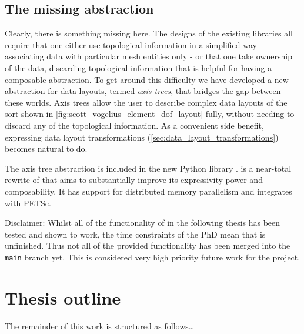 \documentclass[thesis]{subfiles}
\begin{document}

\subsection{The missing abstraction}

Clearly, there is something missing here.
The designs of the existing libraries all require that one either use topological information in a simplified way - associating data with particular mesh entities only - or that one take ownership of the data, discarding topological information that is helpful for having a composable abstraction.
To get around this difficulty we have developed a new abstraction for data layouts, termed \textit{axis trees}, that bridges the gap between these worlds.
Axis trees allow the user to describe complex data layouts of the sort shown in \cref{fig:scott_vogelius_element_dof_layout} fully, without needing to discard any of the topological information.
As a convenient side benefit, expressing data layout transformations (\cref{sec:data_layout_transformations}) becomes natural to do.

The axis tree abstraction is included in the new Python library .
 is a near-total rewrite of  that aims to substantially improve its expressivity power and composability.
It has support for distributed memory parallelism and integrates with PETSc.

Disclaimer:
Whilst all of the functionality of  in the following thesis has been tested and shown to work, the time constraints of the PhD mean that  is unfinished.
Thus not all of the provided functionality has been merged into the \texttt{main} branch yet.
This is considered very high priority future work for the project.

\section{Thesis outline}

The remainder of this work is structured as follows\dots
\end{document}
